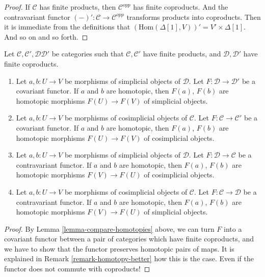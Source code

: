 \begin{proof}
If $\mathcal{C}$ has finite products, then
$\mathcal{C}^{opp}$ has finite coproducts.
And the contravariant functor $(-)' : \mathcal{C} \to \mathcal{C}^{opp}$
transforms products into coproducts.
Then it is immediate from the definitions
that $(\text{Hom}(\Delta[1], V))' = V' \times \Delta[1]$.
And so on and so forth.
\end{proof}

\begin{lemma}
\label{lemma-functorial-homotopy}
Let $\mathcal{C}, \mathcal{C}', \mathcal{D}\mathcal{D}'$
be categories such that $\mathcal{C}, \mathcal{C}'$ have
finite products, and $\mathcal{D}, \mathcal{D}'$ have
finite coproducts.
\begin{enumerate}
\item Let $a, b : U \to V$ be morphisms of simplicial objects
of $\mathcal{D}$. Let $F : \mathcal{D} \to \mathcal{D}'$ be a covariant
functor. If $a$ and $b$ are homotopic, then $F(a)$, $F(b)$
are homotopic morphisms $F(U) \to F(V)$ of simplicial objects.
\item Let $a, b : U \to V$ be morphisms of cosimplicial objects
of $\mathcal{C}$. Let $F : \mathcal{C} \to \mathcal{C}'$ be a covariant
functor. If $a$ and $b$ are homotopic, then $F(a)$, $F(b)$
are homotopic morphisms $F(U) \to F(V)$ of cosimplicial objects.
\item Let $a, b : U \to V$ be morphisms of simplicial objects of $\mathcal{D}$.
Let $F : \mathcal{D} \to \mathcal{C}$ be a contravariant
functor. If $a$ and $b$ are homotopic, then $F(a)$, $F(b)$
are homotopic morphisms $F(V) \to F(U)$ of cosimplicial objects.
\item Let $a, b : U \to V$ be morphisms of cosimplicial objects of
$\mathcal{C}$.
Let $F : \mathcal{C} \to \mathcal{D}$ be a contravariant
functor. If $a$ and $b$ are homotopic, then $F(a)$, $F(b)$
are homotopic morphisms $F(V) \to F(U)$ of simplicial objects.
\end{enumerate}
\end{lemma}

\begin{proof}
By Lemma \ref{lemma-compare-homotopies} above, we can
turn $F$ into a covariant functor between a pair of
categories which have finite coproducts, and we have
to show that the functor preserves homotopic pairs
of maps. It is explained in Remark \ref{remark-homotopy-better} how this
is the case. Even if the functor does not commute with
coproducts!
\end{proof}

